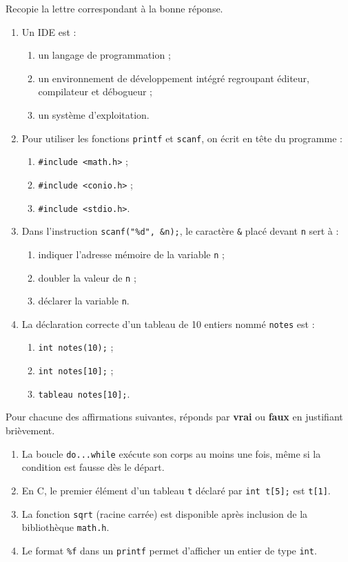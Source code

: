 \documentclass[11pt]{article}
\begin{document}
\begin{exercice}
Recopie la lettre correspondant à la bonne réponse.
\begin{enumerate}
\item Un IDE est :
\begin{enumerate}
\item un langage de programmation ;
\item un environnement de développement intégré regroupant éditeur, compilateur et débogueur ;
\item un système d'exploitation.
\end{enumerate}
\item Pour utiliser les fonctions \texttt{printf} et \texttt{scanf}, on écrit en tête du programme :
\begin{enumerate}
\item \texttt{\#include <math.h>} ;
\item \texttt{\#include <conio.h>} ;
\item \texttt{\#include <stdio.h>}.
\end{enumerate}
\item Dans l'instruction \texttt{scanf("\%d", \&n);}, le caractère \texttt{\&} placé devant \texttt{n} sert à :
\begin{enumerate}
\item indiquer l'adresse mémoire de la variable \texttt{n} ;
\item doubler la valeur de \texttt{n} ;
\item déclarer la variable \texttt{n}.
\end{enumerate}
\item La déclaration correcte d'un tableau de 10 entiers nommé \texttt{notes} est :
\begin{enumerate}
\item \texttt{int notes(10);} ;
\item \texttt{int notes[10];} ;
\item \texttt{tableau notes[10];}.
\end{enumerate}
\end{enumerate}
\end{exercice}

\begin{exercice}
Pour chacune des affirmations suivantes, réponds par \textbf{vrai} ou \textbf{faux} en justifiant brièvement.
\begin{enumerate}
\item La boucle \texttt{do...while} exécute son corps au moins une fois, même si la condition est fausse dès le départ.
\item En C, le premier élément d'un tableau \texttt{t} déclaré par \texttt{int t[5];} est \texttt{t[1]}.
\item La fonction \texttt{sqrt} (racine carrée) est disponible après inclusion de la bibliothèque \texttt{math.h}.
\item Le format \texttt{\%f} dans un \texttt{printf} permet d'afficher un entier de type \texttt{int}.
\end{enumerate}
\end{exercice}
\end{document}
